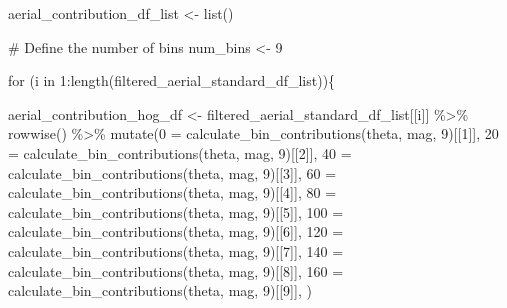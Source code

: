 \documentclass[
  letterpaper,
  DIV=11,
  numbers=noendperiod]{scrreprt}
\newenvironment{Shaded}{\begin{snugshade}}{\end{snugshade}}
\newcommand{\AttributeTok}[1]{\textcolor[rgb]{0.40,0.45,0.13}{#1}}
\newcommand{\CommentTok}[1]{\textcolor[rgb]{0.37,0.37,0.37}{#1}}
\newcommand{\ControlFlowTok}[1]{\textcolor[rgb]{0.00,0.23,0.31}{#1}}
\newcommand{\DecValTok}[1]{\textcolor[rgb]{0.68,0.00,0.00}{#1}}
\newcommand{\FunctionTok}[1]{\textcolor[rgb]{0.28,0.35,0.67}{#1}}
\newcommand{\NormalTok}[1]{\textcolor[rgb]{0.00,0.23,0.31}{#1}}
\newcommand{\OtherTok}[1]{\textcolor[rgb]{0.00,0.23,0.31}{#1}}
\newcommand{\SpecialCharTok}[1]{\textcolor[rgb]{0.37,0.37,0.37}{#1}}
\newcommand{\StringTok}[1]{\textcolor[rgb]{0.13,0.47,0.30}{#1}}
\begin{document}
\begin{Shaded}
\begin{Highlighting}[]
\NormalTok{aerial\_contribution\_df\_list }\OtherTok{\textless{}{-}} \FunctionTok{list}\NormalTok{()}

\CommentTok{\# Define the number of bins}
\NormalTok{num\_bins }\OtherTok{\textless{}{-}} \DecValTok{9}
 
\ControlFlowTok{for}\NormalTok{ (i }\ControlFlowTok{in} \DecValTok{1}\SpecialCharTok{:}\FunctionTok{length}\NormalTok{(filtered\_aerial\_standard\_df\_list))\{}
  
\NormalTok{  aerial\_contribution\_hog\_df }\OtherTok{\textless{}{-}} 
\NormalTok{    filtered\_aerial\_standard\_df\_list[[i]] }\SpecialCharTok{\%\textgreater{}\%}
    \FunctionTok{rowwise}\NormalTok{() }\SpecialCharTok{\%\textgreater{}\%}
    \FunctionTok{mutate}\NormalTok{(}\StringTok{\textasciigrave{}}\AttributeTok{0}\StringTok{\textasciigrave{}} \OtherTok{=} \FunctionTok{calculate\_bin\_contributions}\NormalTok{(theta, mag, }\DecValTok{9}\NormalTok{)[[}\DecValTok{1}\NormalTok{]],}
           \StringTok{\textasciigrave{}}\AttributeTok{20}\StringTok{\textasciigrave{}} \OtherTok{=} \FunctionTok{calculate\_bin\_contributions}\NormalTok{(theta, mag, }\DecValTok{9}\NormalTok{)[[}\DecValTok{2}\NormalTok{]],}
           \StringTok{\textasciigrave{}}\AttributeTok{40}\StringTok{\textasciigrave{}} \OtherTok{=} \FunctionTok{calculate\_bin\_contributions}\NormalTok{(theta, mag, }\DecValTok{9}\NormalTok{)[[}\DecValTok{3}\NormalTok{]],}
           \StringTok{\textasciigrave{}}\AttributeTok{60}\StringTok{\textasciigrave{}} \OtherTok{=} \FunctionTok{calculate\_bin\_contributions}\NormalTok{(theta, mag, }\DecValTok{9}\NormalTok{)[[}\DecValTok{4}\NormalTok{]],}
           \StringTok{\textasciigrave{}}\AttributeTok{80}\StringTok{\textasciigrave{}} \OtherTok{=} \FunctionTok{calculate\_bin\_contributions}\NormalTok{(theta, mag, }\DecValTok{9}\NormalTok{)[[}\DecValTok{5}\NormalTok{]],}
           \StringTok{\textasciigrave{}}\AttributeTok{100}\StringTok{\textasciigrave{}} \OtherTok{=} \FunctionTok{calculate\_bin\_contributions}\NormalTok{(theta, mag, }\DecValTok{9}\NormalTok{)[[}\DecValTok{6}\NormalTok{]],}
           \StringTok{\textasciigrave{}}\AttributeTok{120}\StringTok{\textasciigrave{}} \OtherTok{=} \FunctionTok{calculate\_bin\_contributions}\NormalTok{(theta, mag, }\DecValTok{9}\NormalTok{)[[}\DecValTok{7}\NormalTok{]],}
           \StringTok{\textasciigrave{}}\AttributeTok{140}\StringTok{\textasciigrave{}} \OtherTok{=} \FunctionTok{calculate\_bin\_contributions}\NormalTok{(theta, mag, }\DecValTok{9}\NormalTok{)[[}\DecValTok{8}\NormalTok{]],}
           \StringTok{\textasciigrave{}}\AttributeTok{160}\StringTok{\textasciigrave{}} \OtherTok{=} \FunctionTok{calculate\_bin\_contributions}\NormalTok{(theta, mag, }\DecValTok{9}\NormalTok{)[[}\DecValTok{9}\NormalTok{]],}
\NormalTok{           )}
  

\end{Highlighting}
\end{Shaded}
\end{document}
